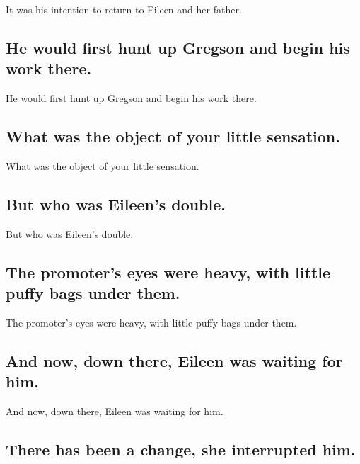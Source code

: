 \documentclass[]{article}
\begin{document}
It was his intention to return to Eileen and her father.

\hypertarget{he-would-first-hunt-up-gregson-and-begin-his-work-there.}{%
\subsection{He would first hunt up Gregson and begin his work
there.}\label{he-would-first-hunt-up-gregson-and-begin-his-work-there.}}

He would first hunt up Gregson and begin his work there.

\hypertarget{what-was-the-object-of-your-little-sensation.}{%
\subsection{What was the object of your little
sensation.}\label{what-was-the-object-of-your-little-sensation.}}

What was the object of your little sensation.

\hypertarget{but-who-was-eileens-double.}{%
\subsection{But who was Eileen's
double.}\label{but-who-was-eileens-double.}}

But who was Eileen's double.

\hypertarget{the-promoters-eyes-were-heavy-with-little-puffy-bags-under-them.}{%
\subsection{The promoter's eyes were heavy, with little puffy bags under
them.}\label{the-promoters-eyes-were-heavy-with-little-puffy-bags-under-them.}}

The promoter's eyes were heavy, with little puffy bags under them.

\hypertarget{and-now-down-there-eileen-was-waiting-for-him.}{%
\subsection{And now, down there, Eileen was waiting for
him.}\label{and-now-down-there-eileen-was-waiting-for-him.}}

And now, down there, Eileen was waiting for him.

\hypertarget{there-has-been-a-change-she-interrupted-him.}{%
\subsection{There has been a change, she interrupted
him.}\label{there-has-been-a-change-she-interrupted-him.}}
\end{document}
